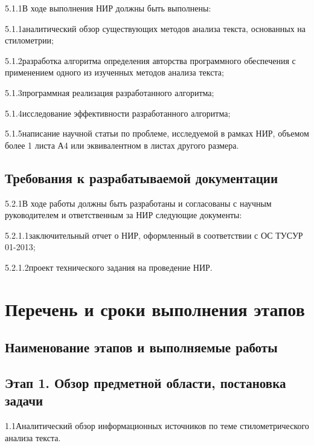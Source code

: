 5.1.1\hspace{5mm}В ходе выполнения НИР должны быть выполнены:

5.1.1\hspace{5mm}аналитический обзор существующих методов анализа текста, основанных на стилометрии;

5.1.2\hspace{5mm}разработка алгоритма определения авторства программного обеспечения с применением одного из изученных методов анализа текста;

5.1.3\hspace{5mm}программная реализация разработанного алгоритма;

5.1.4\hspace{5mm}исследование эффективности разработанного алгоритма;

5.1.5\hspace{5mm}написание научной статьи по проблеме, исследуемой в рамках НИР, объемом более 1 листа А4 или эквивалентном в листах другого размера.

\subsection{Требования к разрабатываемой документации}
5.2.1\hspace{5mm}В ходе работы должны быть разработаны и согласованы с научным руководителем и ответственным за НИР	 следующие документы:

5.2.1.1\hspace{5mm}заключительный отчет о НИР, оформленный в соответствии с ОС ТУСУР 01-2013;

5.2.1.2\hspace{5mm}проект технического задания на проведение НИР.

\section{Перечень и сроки выполнения этапов}
\subsection{Наименование этапов и выполняемые работы}
\subsection*{Этап 1. Обзор предметной области, постановка задачи}

1.1\hspace{5mm}Аналитический обзор информационных источников по теме стилометрического анализа текста.

